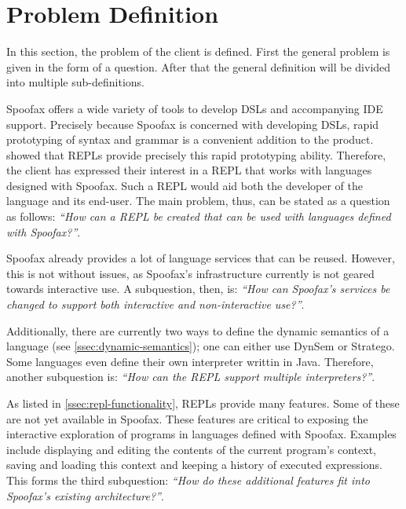 \section{Problem Definition}
\label{sec:problem-definition}

In this section, the problem of the client is defined. First the
general problem is given in the form of a question. After that the
general definition will be divided into multiple sub-definitions.

Spoofax offers a wide variety of tools to develop DSLs and accompanying IDE
support. Precisely because Spoofax is concerned with developing DSLs, rapid
prototyping of syntax and grammar is a convenient addition to the product.
 showed that REPLs provide precisely this rapid prototyping
ability.  Therefore, the client has expressed their interest in a REPL that
works with languages designed with Spoofax. Such a REPL would aid both the
developer of the language and its end-user. The main problem, thus, can be
stated as a question as follows: \textit{``How can a REPL be created that can be
used with languages defined with Spoofax?''}.

Spoofax already provides a lot of language services that can be reused. However,
this is not without issues, as Spoofax's infrastructure currently is not geared
towards interactive use. A subquestion, then, is: \textit{``How can Spoofax's
services be changed to support both interactive and non-interactive use?''}.

Additionally, there are currently two ways to define the dynamic semantics of a
language (see \cref{ssec:dynamic-semantics}); one can either use DynSem or Stratego.
Some languages even define their own interpreter writtin in Java. Therefore,
another subquestion is: \textit{``How can the REPL support multiple
interpreters?''}.

As listed in \cref{ssec:repl-functionality}, REPLs provide many features. Some
of these are not yet available in Spoofax. These features are critical to
exposing the interactive exploration of programs in languages defined with
Spoofax. Examples include displaying and editing the contents of the current
program's context, saving and loading this context and keeping a history of
executed expressions. This forms the third subquestion: \textit{``How do these
additional features fit into Spoofax's existing architecture?''}.

